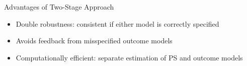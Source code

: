 \documentclass{beamer}
\begin{document}
\begin{frame}{Advantages of Two-Stage Approach}
 
    \begin{itemize}
       \vfill \item Double robustness: consistent if either model is correctly specified
        \vfill \item Avoids feedback from misspecified outcome models
        \vfill \item Computationally efficient: separate estimation of PS and outcome models
    \end{itemize}


     
 \end{frame}


          
        
\end{document}
